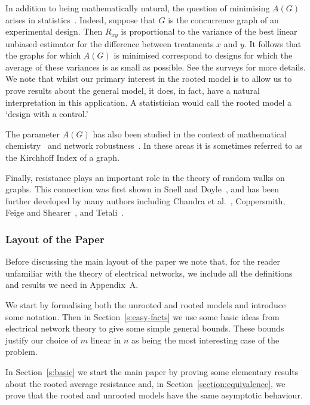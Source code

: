 \documentclass[11pt]{article}
\theoremstyle{remark}
\begin{document}
In addition to being mathematically natural, the question of
minimising $A(G)$ arises in
statistics~\cite{MR2409757,MR1105858}. Indeed, suppose that $G$ is the
concurrence graph of an experimental design. Then $R_{xy}$ is
proportional to the variance of the best linear unbiased estimator for
the difference between treatments $x$ and $y$. It follows that the
graphs for which $A(G)$ is minimised correspond to designs for which
the average of these variances is as small as possible. See the
surveys \cite{MR2588537,MR3026766} for more details. We note that
whilst our primary interest in the rooted model is to allow us to
prove results about the general model, it does, in fact, have a
natural interpretation in this application. A statistician would call
the rooted model a `design with a control.'




The parameter $A(G)$ has also been studied in the context of
mathematical chemistry~\cite{QUA:QUA1} and network
robustness~\cite{MR2811133}. In these areas it is sometimes referred
to as the Kirchhoff Index of a graph.

Finally, resistance plays an important role in the theory of random
walks on graphs. This connection was first shown in Snell and
Doyle~\cite{MR920811}, and has been further developed by many authors
including Chandra et al.~\cite{MR1613611}, Coppersmith, Feige and
Shearer~\cite{MR1386885}, and Tetali~\cite{MR1088395}.

\subsubsection*{Layout of the Paper}
Before discussing the main layout of the paper we note that, for the
reader unfamiliar with the theory of electrical networks, we include
all the definitions and results we need in Appendix~A.

We start by formalising both the unrooted and rooted models and
introduce some notation. Then in Section~\ref{s:easy-facts} we use
some basic ideas from electrical network theory to give some simple
general bounds. These bounds justify our choice of $m$ linear in $n$
as being the most interesting case of the problem.

In Section~\ref{s:basic} we start the main paper by proving some
elementary results about the rooted average resistance and, in
Section~\ref{section:equivalence}, we prove that the rooted and unrooted
models have the same asymptotic behaviour.
\end{document}
